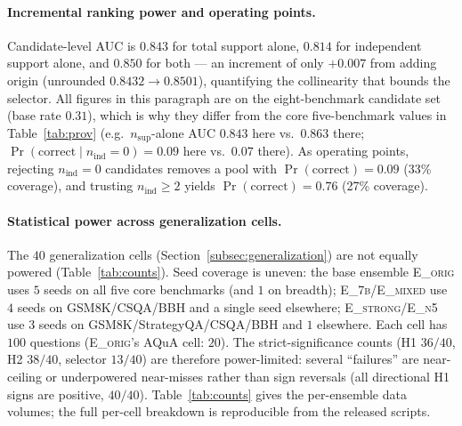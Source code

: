 \paragraph{Incremental ranking power and operating points.}
Candidate-level AUC is $0.843$ for total support alone, $0.814$ for independent support alone, and $0.850$
for both --- an increment of only $+0.007$ from adding origin (unrounded $0.8432\to0.8501$), quantifying the collinearity that bounds the
selector. All figures in this paragraph are on the eight-benchmark candidate set (base rate $0.31$), which is
why they differ from the core five-benchmark values in Table~\ref{tab:prov} (e.g.\ $n_{\mathrm{sup}}$-alone AUC
$0.843$ here vs.\ $0.863$ there; $\Pr(\text{correct}\mid n_{\mathrm{ind}}{=}0)=0.09$ here vs.\ $0.07$ there).
As operating points, rejecting $n_{\mathrm{ind}}=0$ candidates removes a pool with $\Pr(\text{correct})=0.09$
(33\% coverage), and trusting $n_{\mathrm{ind}}\ge 2$ yields $\Pr(\text{correct})=0.76$ (27\% coverage).

\paragraph{Statistical power across generalization cells.}
The $40$ generalization cells (Section~\ref{subsec:generalization}) are not equally powered (Table~\ref{tab:counts}).
Seed coverage is uneven: the base ensemble \textsc{E\_orig} uses $5$ seeds on all five core benchmarks (and
$1$ on breadth); \textsc{E\_7b}/\textsc{E\_mixed} use $4$ seeds on GSM8K/CSQA/BBH and a single seed
elsewhere; \textsc{E\_strong}/\textsc{E\_n5} use $3$ seeds on GSM8K/StrategyQA/CSQA/BBH and $1$ elsewhere. Each cell has $100$ questions
(\textsc{E\_orig}'s AQuA cell: $20$). The strict-significance counts (H1 $36/40$, H2 $38/40$,
selector $13/40$) are therefore power-limited: several ``failures'' are near-ceiling or underpowered
near-misses rather than sign reversals (all directional H1 signs are positive, $40/40$). Table~\ref{tab:counts}
gives the per-ensemble data volumes; the full per-cell breakdown is reproducible from the released scripts.

